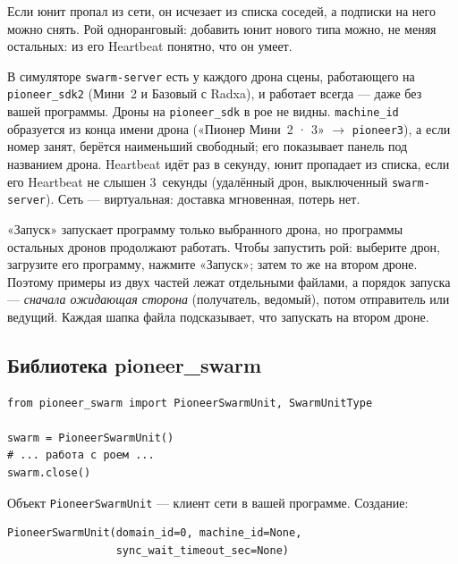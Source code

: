 Если юнит пропал из сети, он исчезает из списка соседей, а подписки на него можно снять. Рой одноранговый: добавить юнит нового типа можно, не меняя остальных: из его Heartbeat понятно, что он умеет.

\begin{infobox}
В симуляторе \texttt{swarm-server} есть у каждого дрона сцены, работающего на \texttt{pioneer\_sdk2} (Мини~2 и Базовый с Radxa), и работает всегда --- даже без вашей программы. Дроны на \texttt{pioneer\_sdk} в рое не видны. \texttt{machine\_id} образуется из конца имени дрона («Пионер Мини~2 · 3» $\to$ \texttt{pioneer3}), а если номер занят, берётся наименьший свободный; его показывает панель  под названием дрона. Heartbeat идёт раз в секунду, юнит пропадает из списка, если его Heartbeat не слышен 3~секунды (удалённый дрон, выключенный \texttt{swarm-server}). Сеть --- виртуальная: доставка мгновенная, потерь нет.
\end{infobox}

\begin{warnbox}
«Запуск» запускает программу только выбранного дрона, но программы остальных дронов продолжают работать. Чтобы запустить рой: выберите дрон, загрузите его программу, нажмите «Запуск»; затем то же на втором дроне. Поэтому примеры из двух частей лежат отдельными файлами, а порядок запуска --- \emph{сначала ожидающая сторона} (получатель, ведомый), потом отправитель или ведущий. Каждая шапка файла подсказывает, что запускать на втором дроне.
\end{warnbox}

\subsection{Библиотека pioneer\_swarm}

\begin{codebox}
\begin{verbatim}
from pioneer_swarm import PioneerSwarmUnit, SwarmUnitType

swarm = PioneerSwarmUnit()
# ... работа с роем ...
swarm.close()
\end{verbatim}
\end{codebox}

Объект \verb|PioneerSwarmUnit| --- клиент сети в вашей программе. Создание:

\begin{codebox}[Конструктор]
\begin{verbatim}
PioneerSwarmUnit(domain_id=0, machine_id=None,
                 sync_wait_timeout_sec=None)
\end{verbatim}
\end{codebox}

